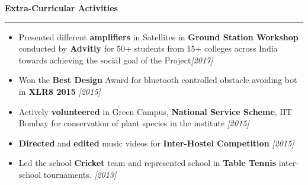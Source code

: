 \documentclass[11pt]{article}%
\begin{document}
\begin{center}
\bf{\Large{Extra-Curricular Activities}}
\end{center}
\hrule

\begin{itemize}[leftmargin=*]
    \setlength\itemsep{0.01em}
    \vspace{-1mm}
    \item Presented different \textbf{amplifiers} in Satellites in \textbf{Ground Station Workshop} conducted by \textbf{Advitiy} for 50+ students from 15+ colleges across India towards achieving the social goal of the Project\hfill {\em{[2017]}}
    \item Won the \textbf{Best Design} Award for bluetooth controlled obstacle avoiding bot in \textbf{XLR8 2015} \hfill {\em[2015]}
    \item Actively \textbf{volunteered} in Green Campus, \textbf{National Service Scheme}, IIT Bombay for conservation of plant species in the institute \hfill {\em[2015]}
    \item \textbf{Directed} and \textbf{edited} music videos for \textbf{Inter-Hostel Competition} \hfill {\em[2015]}
    \item Led the school \textbf{Cricket} team and represented school in \textbf{Table Tennis} inter-school tournaments. \hfill{\em[2013]}
\end{itemize}
\end{document}
